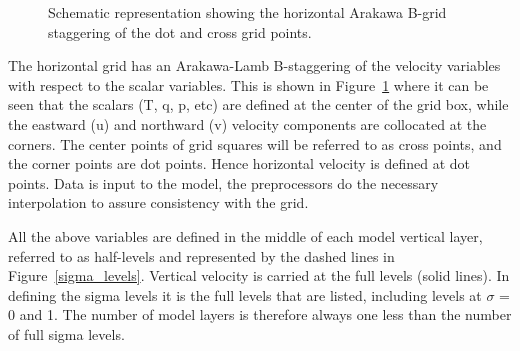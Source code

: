 \begin{figure} \begin{center} 
\caption{Schematic representation showing the horizontal Arakawa B-grid
staggering of the dot and cross grid points.}  \label{grid} \end{center}
\end{figure}

The horizontal grid has an Arakawa-Lamb B-staggering of the velocity variables
with respect to the scalar variables. This is shown in Figure~\ref{grid} where
it can be seen that the scalars (T, q, p, etc) are defined at the center of the
grid box, while the eastward (u) and northward (v) velocity components are
collocated at the corners. The center points of grid squares will be referred to
as cross points, and the corner points are dot points.  Hence horizontal
velocity is defined at dot points. Data is input to the model, the preprocessors
do the necessary interpolation to assure consistency with the grid.

All the above variables are defined in the middle of each model vertical layer,
referred to as half-levels and represented by the dashed lines in
Figure~\ref{sigma_levels}. Vertical velocity is carried at the full levels
(solid lines). In defining the sigma levels it is the full levels that are
listed, including levels at $\sigma$ = 0 and 1. The number of model layers is
therefore always one less than the number of full sigma levels.

